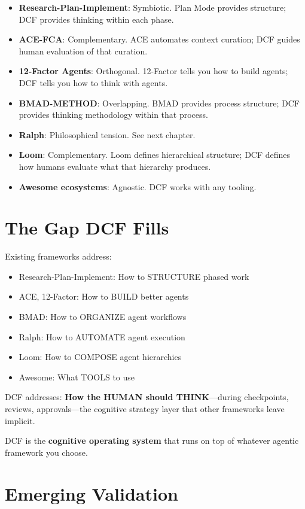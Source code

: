 \begin{itemize}
    \item \textbf{Research-Plan-Implement}: Symbiotic. Plan Mode provides structure; DCF provides thinking within each phase.
    \item \textbf{ACE-FCA}: Complementary. ACE automates context curation; DCF guides human evaluation of that curation.
    \item \textbf{12-Factor Agents}: Orthogonal. 12-Factor tells you how to build agents; DCF tells you how to think with agents.
    \item \textbf{BMAD-METHOD}: Overlapping. BMAD provides process structure; DCF provides thinking methodology within that process.
    \item \textbf{Ralph}: Philosophical tension. See next chapter.
    \item \textbf{Loom}: Complementary. Loom defines hierarchical structure; DCF defines how humans evaluate what that hierarchy produces.
    \item \textbf{Awesome ecosystems}: Agnostic. DCF works with any tooling.
\end{itemize}

\section{The Gap DCF Fills}

Existing frameworks address:
\begin{itemize}
    \item Research-Plan-Implement: How to STRUCTURE phased work
    \item ACE, 12-Factor: How to BUILD better agents
    \item BMAD: How to ORGANIZE agent workflows
    \item Ralph: How to AUTOMATE agent execution
    \item Loom: How to COMPOSE agent hierarchies
    \item Awesome: What TOOLS to use
\end{itemize}

DCF addresses: \textbf{How the HUMAN should THINK}---during checkpoints, reviews, approvals---the cognitive strategy layer that other frameworks leave implicit.

DCF is the \textbf{cognitive operating system} that runs on top of whatever agentic framework you choose.

\section{Emerging Validation}

